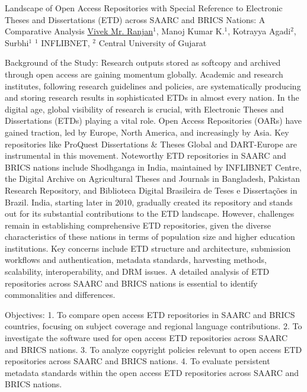 \begin{abstract_online}{Landscape of Open Access Repositories with Special Reference to Electronic Theses and Dissertations (ETD) across SAARC and BRICS Nations: A Comparative Analysis}{%
    \underline{Vivek Mr. Ranjan}$^{1}$, Manoj Kumar K.$^{1}$, Kotrayya Agadi$^{2}$, Surbhi$^{1}$}{%
    $^1$ INFLIBNET, \newline%
    $^2$ Central University of Gujarat%
}

Background of the Study: Research outputs stored as softcopy and archived through open access are gaining momentum globally. Academic and research institutes, following research guidelines and policies, are systematically producing and storing research results in sophisticated ETDs in almost every nation. In the digital age, global visibility of research is crucial, with Electronic Theses and Dissertations (ETDs) playing a vital role. Open Access Repositories (OARs) have gained traction, led by Europe, North America, and increasingly by Asia. Key repositories like ProQuest Dissertations \& Theses Global and DART-Europe are instrumental in this movement. Noteworthy ETD repositories in SAARC and BRICS nations include Shodhganga in India, maintained by INFLIBNET Centre, the Digital Archive on Agricultural Theses and Journals in Bangladesh, Pakistan Research Repository, and Biblioteca Digital Brasileira de Teses e Dissertações in Brazil. India, starting later in 2010, gradually created its repository and stands out for its substantial contributions to the ETD landscape. However, challenges remain in establishing comprehensive ETD repositories, given the diverse characteristics of these nations in terms of population size and higher education institutions. Key concerns include ETD structure and architecture, submission workflows and authentication, metadata standards, harvesting methods, scalability, interoperability, and DRM issues. A detailed analysis of ETD repositories across SAARC and BRICS nations is essential to identify commonalities and differences.

Objectives:
1. To compare open access ETD repositories in SAARC and BRICS countries, focusing on subject coverage and regional language contributions.
2. To investigate the software used for open access ETD repositories across SAARC and BRICS nations.
3. To analyze copyright policies relevant to open access ETD repositories across SAARC and BRICS nations.
4. To evaluate persistent metadata standards within the open access ETD repositories across SAARC and BRICS nations.


\end{abstract_online}
